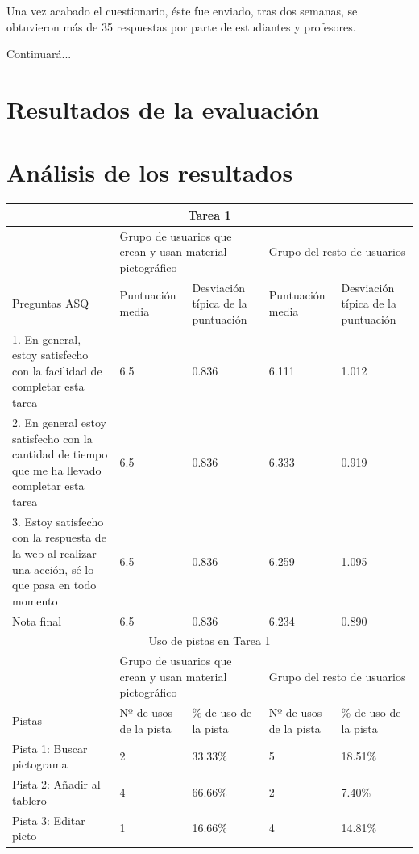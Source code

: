 Una vez acabado el cuestionario, éste fue enviado, tras dos semanas, se obtuvieron más de 35 respuestas por parte de estudiantes y profesores. 

Continuará...

\section{Resultados de la evaluación}
\label{eva:res}

\section{Análisis de los resultados}
\label{eva:analisis}


\begin{tabular}{ |p{4cm}|p{2cm}|p{2cm}|p{2cm}|p{2cm}|  }
	\hline
	\multicolumn{5}{|c|}{Tarea 1} \\
	\hline
	 & \multicolumn{2}{|p{4cm}|}{Grupo de usuarios que crean y usan material pictográfico} & \multicolumn{2}{|p{4cm}|}{Grupo del resto de usuarios }  \\ 
	\hline
	 Preguntas ASQ & Puntuación media  &Desviación típica de la puntuación & Puntuación media & Desviación típica de la puntuación\\
	\hline
	1. En general, estoy satisfecho con la facilidad de completar esta tarea &6.5  &0.836 &6.111  &1.012\\
	\hline
	2. En general estoy satisfecho con la cantidad de tiempo que me ha llevado completar esta tarea&6.5  &0.836  &6.333 &0.919\\
	\hline
	3. Estoy satisfecho con la respuesta de la web al realizar una acción, sé lo que pasa en todo momento &6.5 &0.836 & 6.259  &1.095\\
	\hline
	Nota final &6.5 &0.836 &6.234  &0.890\\
	\hline
	\multicolumn{5}{|c|}{Uso de pistas en Tarea 1} \\
	\hline
	& \multicolumn{2}{|p{4cm}|}{Grupo de usuarios que crean y usan material pictográfico} & \multicolumn{2}{|p{4cm}|}{Grupo del resto de usuarios }  \\ 
	\hline
	 Pistas &Nº de usos de la pista &\% de uso de la pista&Nº de usos de la pista&\% de uso de la pista\\
	\hline
	Pista 1: Buscar pictograma &2  &33.33\% &5  &18.51\%\\
	\hline
	Pista 2: Añadir al tablero &4  &66.66\%  &2 &7.40\%\\
	\hline
	Pista 3: Editar picto &1 &16.66\% &4  &14.81\%\\
	\hline
\end{tabular}


